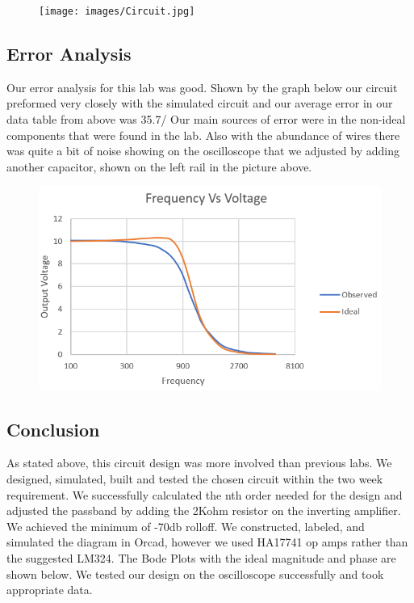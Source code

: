 \documentclass[11pt]{article}
\begin{document}
\begin{figure}[H]
	    \centering
	    \texttt{[image: images/Circuit.jpg]}
	 \end{figure}
	 \newpage
	\subsection*{Error Analysis}
	Our error analysis for this lab was good. Shown by the graph below our circuit preformed very closely with the simulated circuit and our average error in our data table from above was 35.7/%
	Our main sources of error were in the non-ideal components that were found in the lab. Also with the abundance of wires there was quite a bit of noise showing on the oscilloscope that we adjusted by adding another capacitor, shown on the left rail in the picture above. 			
	\begin{figure}[H]
		\centering
		\includegraphics[width=5.5in]{images/comparison_graph.PNG}
	\end{figure}
\subsection*{Conclusion}
	As stated above, this circuit design was more involved than previous labs. We designed, simulated, built and tested the chosen circuit within the two week requirement. We successfully calculated the nth order needed for the design and adjusted the passband by adding the 2Kohm resistor on the inverting amplifier. We achieved the minimum of -70db rolloff. We constructed, labeled, and simulated the diagram in Orcad, however we used HA17741 op amps rather than the suggested LM324. The Bode Plots with the ideal magnitude and phase are shown below. We tested our design on the oscilloscope successfully and took appropriate data.
\end{document}
